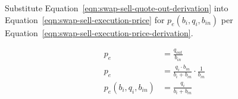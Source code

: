 \documentclass[table, twocolumn]{article}
\begin{document}
Substitute Equation~\ref{eqn:swap-sell-quote-out-derivation} into
Equation~\ref{eqn:swap-sell-execution-price} for $p_e(b_i, q_i, b_{in})$ per
Equation~\ref{eqn:swap-sell-execution-price-derivation}.

\begin{align}\label{eqn:swap-sell-execution-price-derivation}
	p_e                    & = \frac{q_{out}}{b_{in}} \nonumber            \\
	p_e                    & =
	\frac{q_i \cdot b_{in}}{b_i + b_{in}} \cdot \frac{1}{b_{in}} \nonumber \\
	p_e (b_i, q_i, b_{in}) & = \frac{q_i}{b_i + b_{in}}
\end{align}
\end{document}
